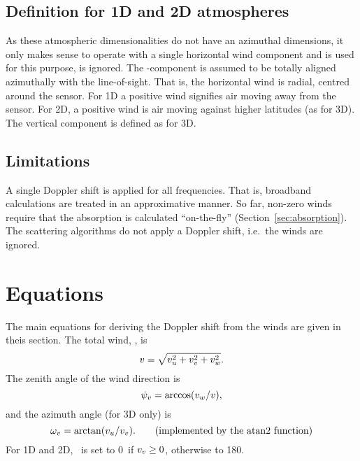 \subsection{Definition for 1D and 2D atmospheres}
%
As these atmospheric dimensionalities do not have an azimuthal dimensions, it
only makes sense to operate with a single horizontal wind component and
 is used for this purpose, 
is ignored. The \WindSN-component is assumed to be totally aligned azimuthally
with the line-of-sight. That is, the horizontal wind is radial, centred around
the sensor. For 1D a positive wind signifies air moving away from the sensor.
For 2D, a positive wind is air moving against higher latitudes (as for 3D).
The vertical component is defined as for 3D.
 

\subsection{Limitations}
\label{sec:winds:limitations}
%
A single Doppler shift is applied for all frequencies. That is, broadband
calculations are treated in an approximative manner. So far, non-zero winds
require that the absorption is calculated ``on-the-fly''
(Section~\ref{sec:absorption}). The scattering algorithms do not apply a
Doppler shift, i.e.\ the winds are ignored.



\section{Equations}
\label{sec:winds:eqs}

The main equations for deriving the Doppler shift from the winds are given in
theis section. The total wind, \Wind, is
\begin{equation}
  v = \sqrt{v_u^2+v_v^2+v_w^2}.
  \label{eq:winds:total}
\end{equation}
The zenith angle of the wind direction is 
\begin{equation}
  \psi_{v} = \arccos(v_w/v),
  \label{eq:winds:za}
\end{equation}
and the azimuth angle (for 3D only) is 
\begin{equation}
  \aAzmAng{\Wind} = \arctan(\WindWE/\WindSN). \qquad 
                           \mathrm{(implemented\ by\ the\ atan2\ function)}
  \label{eq:winds:aa}
\end{equation}
For 1D and 2D, \aAzmAng{\Wind}\ is set to 0\degree\ if $v_v \geq 0$,
otherwise to 180\degree. 

